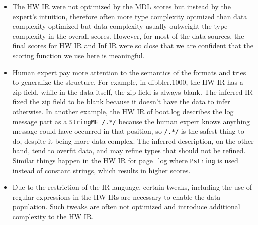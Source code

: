 \begin{itemize}
\item The HW IR were not optimized by the MDL scores but instead
by the expert's intuition, therefore often more type complexity optmized than
data complexity optimized but data complexity usually outweight the type
complexity in the overall scores.
However, for most of the data sources, the final scores for HW IR and Inf IR were so close 
that we are confident that the scoring function we use here is meaningful.

\item Human expert pay more attention to the semantics of the formats and 
tries to generalize the structure. For example, in dibbler.1000, the
HW IR has a zip field, while in the data itself, the zip field is always
blank. The inferred IR fixed the zip field to be
blank because it doesn't have the data to infer otherwise. 
In another example, the HW IR of boot.log describes the log message part 
as a \verb#StringME /.*/# because the human expert knows anything
message could have occurred in that position, so \verb#/.*/# is the safest thing
to do, despite it being more data complex. 
The inferred description, on the other hand, tend to overfit data,
and may refine types that should not be refined. Similar things happen
in the HW IR for page\_log where {\tt Pstring} is used instead of constant strings, 
which results in higher scores.

\item Due to the restriction of the IR language, certain tweaks, including the
use of regular expressions in the HW IRs are necessary to enable
the data population. Such tweaks are often not optimized and introduce
additional complexity to the HW IR. 
\end{itemize}


